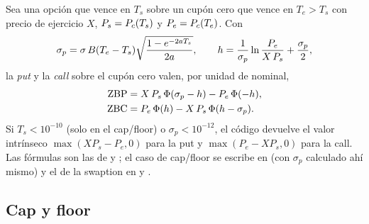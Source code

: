 Sea una opción que vence en $T_s$ sobre un cupón cero que vence en $T_e>T_s$ con precio de ejercicio $X$,
$P_s=P_{c}(T_s)$ y $P_e=P_{c}(T_e)$. Con
\begin{equation}\label{eq:cap05-sigma-p}
  \sigma_p = \sigma\,B(T_e-T_s)\sqrt{\frac{1-e^{-2a T_s}}{2a}},\qquad
  h = \frac{1}{\sigma_p}\ln\frac{P_e}{X\,P_s} + \frac{\sigma_p}{2},
\end{equation}
la \emph{put} y la \emph{call} sobre el cupón cero valen, por unidad de nominal,
\begin{align}
  \mathrm{ZBP} &= X\,P_s\,\Phi(\sigma_p - h) - P_e\,\Phi(-h), \label{eq:cap05-zbp}\\
  \mathrm{ZBC} &= P_e\,\Phi(h) - X\,P_s\,\Phi(h-\sigma_p). \label{eq:cap05-zbc}
\end{align}
Si $T_s<10^{-10}$ (solo en el cap/floor) o $\sigma_p<10^{-12}$, el código devuelve el valor intrínseco
$\max(XP_s-P_e,0)$ para la put y $\max(P_e-XP_s,0)$ para la call. Las fórmulas son las de
\citet{hull1990} y \citet{jamshidian1989}; el caso de cap/floor se escribe en
 (con $\sigma_p$ calculado ahí mismo) y el de la
swaption en  y
.

\subsection{Cap y floor}\label{sec:cap05-capfloor}

